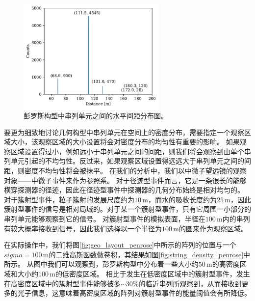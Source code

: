 \begin{figure}[!htb]%
    \centering
    \includegraphics[width=0.65\textwidth]{img/distance_spectrum_penrose.pdf}
    \caption{彭罗斯构型中串列单元之间的水平间距分布图。}
    \label{fig:distance_spectrum_penrose}
\end{figure}

要更为细致地讨论几何构型中串列单元在空间上的密度分布，需要指定一个观察区域大小，该观察区域的大小设置将会对密度分布的均匀性有重要的影响。
如果观察区域设置得过小，例如远小于串列单元之间的间距，则我们将会观察到由单个串列单元引起的不均匀性。反过来，如果观察区域设置得远远大于串列单元之间的间距，则密度不均匀性将会被抹平。
在我们的分析中，我们以中微子望远镜的观察对象——中微子事件来作为参照系。
对于径迹型事件而言，它是一条很长的能够横穿探测器的径迹，因此在径迹型事件中探测器的几何分布始终是相对均匀的。
对于簇射型事件，粒子簇射的发展尺度约为$10\,\mathrm{m}$，而水的吸收长度约为$25\,\mathrm{m}$，因此簇射型事件的信号是相对局域的。对于某一个簇射型事件，只有它周围一小部分的串列单元能够观察到它的信号。
对簇射型事件的模拟表面，半径在$100\,\mathrm{m}$内的串列有较大概率接收到信号，因此我们选择以一个半径为$100\,\mathrm{m}$的圆来作为观察区域。

在实际操作中，我们将图\ref{fig:geo_layout_penrose}中所示的阵列的位置与一个$sigma = 100\,\mathrm{m}$的二维高斯函数做卷积，其结果如图\ref{fig:string_density_penrose}中所示。
从图中我们可以观察到，彭罗斯构型中分布着一些大小约$50\,\mathrm{m}$的高密度区域和大小约$100\,\mathrm{m}$的低密度区域。
相比于发生在低密度区域中的簇射型事件，发生在高密度区域中的簇射型事件能够被多$\sim30\%$的临近串列所观察到，从而接收到更多的光子信息，这意味着高密度区域的阵列对簇射型事件的能量阈值会有所降低。

